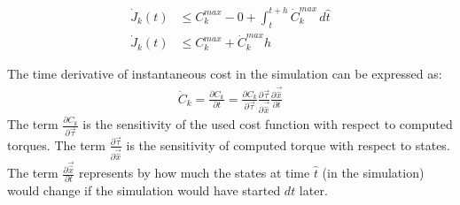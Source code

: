 %
\begin{align}
\dot{J}_k(t) &\leq C_k^{max} -  0   +   \int_{t}^{t+h}{ \dot{C}_k^{max} \, d\hat{t} } \\
\dot{J}_k(t) &\leq C_k^{max}  +   \dot{C}_k^{max} h
\end{align}
%


The time derivative of instantaneous cost in the simulation can be expressed as:
%
\begin{align}
\dot{C}_k    = \frac{\partial C_k}{\partial t} = \frac{\partial C_k}{\partial \vec{\tau}} \frac{\partial \vec{\tau}}{\partial \vec{\hat{x}}} \frac{\partial \vec{\hat{x}}}{\partial t} 
\end{align}
%
The term $\frac{\partial C_k}{\partial \vec{\tau}}$ is the sensitivity of the used cost function with respect to computed torques. The term $\frac{\partial \vec{\tau}}{\partial \vec{\hat{x}}}$ is the sensitivity of computed torque with respect to states. The term $\frac{\partial \vec{\hat{x}}}{\partial t}$ represents by how much the states at time $\hat{t}$ (in the simulation) would change if the simulation would have started $dt$ later. 